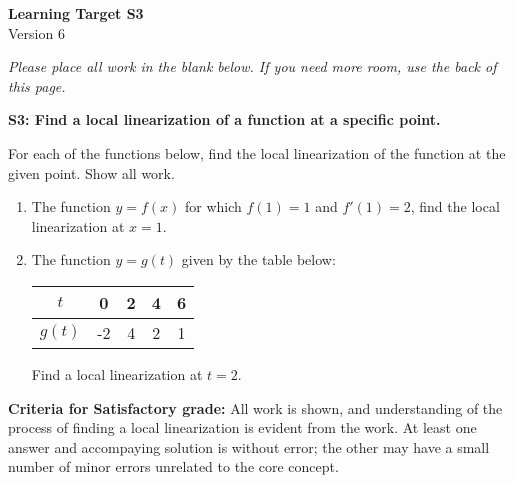 \documentclass[10pt]{article}
\begin{document}
	\vspace*{0in}

		\begin{center}
			\textbf{Learning Target S3} \\
			{Version 6} \\
		\end{center}

\emph{Please place all work in the blank below. If you need more room, use the back of this page.}

\begin{framed}
	\textbf{S3: Find a local linearization of a function at a specific point.}
\end{framed}

For each of the functions below, find the local linearization of the function at the given point. Show all work. 

\begin{enumerate}
    \item The function $y = f(x)$ for which $f(1) = 1$ and $f'(1) = 2$, find the local linearization at $x=1$.
    
    \item The function $y = g(t)$ given by the table below: 
    \begin{center}
            \begin{tabular}{c||c|c|c|c|}
        $t$ &  0 & 2 & 4 & 6  \\ \hline 
        $g(t)$ & -2 & 4 & 2 & 1 
    \end{tabular}
    \end{center}
    Find a local linearization at $t = 2$. 

    
    
\end{enumerate}



\vfill


\begin{small}
    \begin{framed}
        	\textbf{Criteria for Satisfactory grade:} All work is shown, and understanding of the process of finding a local linearization is evident from the work. At least one answer and accompaying solution is without error; the other may have a small number of minor errors unrelated to the core concept. 
    \end{framed}

\end{small}
\end{document}
